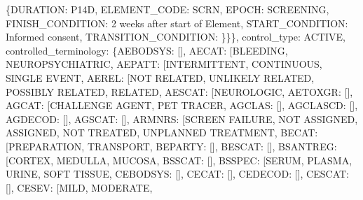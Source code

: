 \documentclass[letterpaper,10pt,english]{sphinxmanual}
\begin{document}
\begin{fulllineitems}
\begin{fulllineitems}
\{\textquotesingle{}DURATION\textquotesingle{}: \textquotesingle{}P14D\textquotesingle{}, \textquotesingle{}ELEMENT\_CODE\textquotesingle{}: \textquotesingle{}SCRN\textquotesingle{}, \textquotesingle{}EPOCH\textquotesingle{}: \textquotesingle{}SCREENING\textquotesingle{}, \textquotesingle{}FINISH\_CONDITION\textquotesingle{}: \textquotesingle{}2 weeks after start of Element\textquotesingle{}, \textquotesingle{}START\_CONDITION\textquotesingle{}: \textquotesingle{}Informed consent\textquotesingle{}, \textquotesingle{}TRANSITION\_CONDITION\textquotesingle{}: \textquotesingle{}\textquotesingle{}\}\}\}, \textquotesingle{}control\_type\textquotesingle{}: \textquotesingle{}ACTIVE\textquotesingle{}, \textquotesingle{}controlled\_terminology\textquotesingle{}: \{\textquotesingle{}AEBODSYS\textquotesingle{}: {[}{]}, \textquotesingle{}AECAT\textquotesingle{}: {[}\textquotesingle{}BLEEDING\textquotesingle{}, \textquotesingle{}NEUROPSYCHIATRIC\textquotesingle{}{]}, \textquotesingle{}AEPATT\textquotesingle{}: {[}\textquotesingle{}INTERMITTENT\textquotesingle{}, \textquotesingle{}CONTINUOUS\textquotesingle{}, \textquotesingle{}SINGLE EVENT\textquotesingle{}{]}, \textquotesingle{}AEREL\textquotesingle{}: {[}\textquotesingle{}NOT RELATED\textquotesingle{}, \textquotesingle{}UNLIKELY RELATED\textquotesingle{}, \textquotesingle{}POSSIBLY RELATED\textquotesingle{}, \textquotesingle{}RELATED\textquotesingle{}{]}, \textquotesingle{}AESCAT\textquotesingle{}: {[}\textquotesingle{}NEUROLOGIC\textquotesingle{}{]}, \textquotesingle{}AETOXGR\textquotesingle{}: {[}{]}, \textquotesingle{}AGCAT\textquotesingle{}: {[}\textquotesingle{}CHALLENGE AGENT\textquotesingle{}, \textquotesingle{}PET TRACER\textquotesingle{}{]}, \textquotesingle{}AGCLAS\textquotesingle{}: {[}{]}, \textquotesingle{}AGCLASCD\textquotesingle{}: {[}{]}, \textquotesingle{}AGDECOD\textquotesingle{}: {[}{]}, \textquotesingle{}AGSCAT\textquotesingle{}: {[}{]}, \textquotesingle{}ARMNRS\textquotesingle{}: {[}\textquotesingle{}SCREEN FAILURE\textquotesingle{}, \textquotesingle{}NOT ASSIGNED\textquotesingle{}, \textquotesingle{}ASSIGNED, NOT TREATED\textquotesingle{}, \textquotesingle{}UNPLANNED TREATMENT\textquotesingle{}{]}, \textquotesingle{}BECAT\textquotesingle{}: {[}\textquotesingle{}PREPARATION\textquotesingle{}, \textquotesingle{}TRANSPORT\textquotesingle{}{]}, \textquotesingle{}BEPARTY\textquotesingle{}: {[}{]}, \textquotesingle{}BESCAT\textquotesingle{}: {[}{]}, \textquotesingle{}BSANTREG\textquotesingle{}: {[}\textquotesingle{}CORTEX\textquotesingle{}, \textquotesingle{}MEDULLA\textquotesingle{}, \textquotesingle{}MUCOSA\textquotesingle{}{]}, \textquotesingle{}BSSCAT\textquotesingle{}: {[}{]}, \textquotesingle{}BSSPEC\textquotesingle{}: {[}\textquotesingle{}SERUM\textquotesingle{}, \textquotesingle{}PLASMA\textquotesingle{}, \textquotesingle{}URINE\textquotesingle{}, \textquotesingle{}SOFT TISSUE\textquotesingle{}{]}, \textquotesingle{}CEBODSYS\textquotesingle{}: {[}{]}, \textquotesingle{}CECAT\textquotesingle{}: {[}{]}, \textquotesingle{}CEDECOD\textquotesingle{}: {[}{]}, \textquotesingle{}CESCAT\textquotesingle{}: {[}{]}, \textquotesingle{}CESEV\textquotesingle{}: {[}\textquotesingle{}MILD\textquotesingle{}, \textquotesingle{}MODERATE\textquotesingle{}, 
\end{fulllineitems}
\end{fulllineitems}
\end{document}
